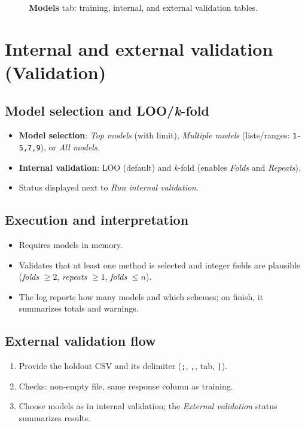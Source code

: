 \documentclass[12pt,a4paper]{article}
\begin{document}
\begin{figure}[H]
  \centering
  \fbox{\rule[0pt]{0pt}{140pt}\hspace{0.9\linewidth}}
  \caption{\textbf{Models} tab: training, internal, and external validation tables.}
  \label{fig:models}
\end{figure}

\section{Internal and external validation (\textbf{Validation})}
\subsection{Model selection and LOO/\emph{k}-fold}
\begin{itemize}
  \item \textbf{Model selection}: \emph{Top models} (with limit), \emph{Multiple models} (lists/ranges: \texttt{1-5,7,9}), or \emph{All models}.
  \item \textbf{Internal validation}: LOO (default) and \emph{k}-fold (enables \emph{Folds} and \emph{Repeats}).
  \item Status displayed next to \emph{Run internal validation}.
\end{itemize}

\subsection{Execution and interpretation}
\begin{itemize}
  \item Requires models in memory.
  \item Validates that at least one method is selected and integer fields are plausible (\emph{folds} $\ge 2$, \emph{repeats} $\ge 1$, \emph{folds} $\le n$).
  \item The log reports how many models and which schemes; on finish, it summarizes totals and warnings.
\end{itemize}

\subsection{External validation flow}
\begin{enumerate}
  \item Provide the holdout CSV and its delimiter (\verb|;|, \verb|,|, tab, \verb/|/).
  \item Checks: non-empty file, same response column as training.
  \item Choose models as in internal validation; the \emph{External validation} status summarizes results.
\end{enumerate}
\end{document}
